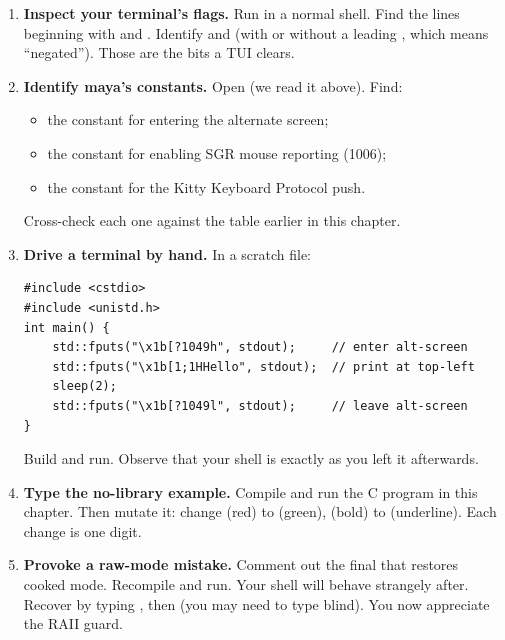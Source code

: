 \begin{enumerate}[leftmargin=*]
  \item \textbf{Inspect your terminal's flags.} Run 
    in a normal shell. Find the lines beginning with 
    and . Identify  and  (with
    or without a leading \code{-}, which means ``negated''). Those
    are the bits a TUI clears.

  \item \textbf{Identify maya's constants.} Open
     (we read it above).
    Find:
    \begin{itemize}[leftmargin=*]
      \item the constant for entering the alternate screen;
      \item the constant for enabling SGR mouse reporting (1006);
      \item the constant for the Kitty Keyboard Protocol push.
    \end{itemize}
    Cross-check each one against the table earlier in this chapter.

  \item \textbf{Drive a terminal by hand.} In a scratch \cpp{} file:
    \begin{lstlisting}
#include <cstdio>
#include <unistd.h>
int main() {
    std::fputs("\x1b[?1049h", stdout);     // enter alt-screen
    std::fputs("\x1b[1;1HHello", stdout);  // print at top-left
    sleep(2);
    std::fputs("\x1b[?1049l", stdout);     // leave alt-screen
}
    \end{lstlisting}
    Build and run. Observe that your shell is exactly as you left it
    afterwards.

  \item \textbf{Type the no-library example.} Compile and run the C
    program in this chapter. Then mutate it: change 
    (red) to  (green),  (bold) to 
    (underline). Each change is one digit.

  \item \textbf{Provoke a raw-mode mistake.} Comment out the final
     that restores cooked mode. Recompile and run.
    Your shell will behave strangely after. Recover by typing
    , then  (you may need to type
    blind). You now appreciate the RAII guard.
\end{enumerate}
